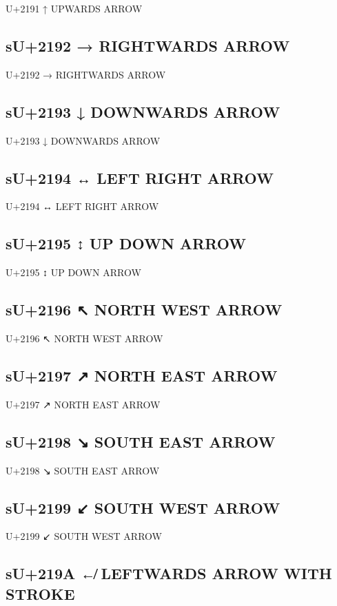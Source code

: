 U+2191 ↑  UPWARDS ARROW

\subsection{sU+2192 →  RIGHTWARDS ARROW}

U+2192 →  RIGHTWARDS ARROW

\subsection{sU+2193 ↓  DOWNWARDS ARROW}

U+2193 ↓  DOWNWARDS ARROW

\subsection{sU+2194 ↔ LEFT RIGHT ARROW}

U+2194 ↔ LEFT RIGHT ARROW

\subsection{sU+2195 ↕ UP DOWN ARROW}

U+2195 ↕ UP DOWN ARROW

\subsection{sU+2196 ↖ NORTH WEST ARROW}

U+2196 ↖ NORTH WEST ARROW

\subsection{sU+2197 ↗ NORTH EAST ARROW}

U+2197 ↗ NORTH EAST ARROW

\subsection{sU+2198 ↘ SOUTH EAST ARROW}

U+2198 ↘ SOUTH EAST ARROW

\subsection{sU+2199 ↙ SOUTH WEST ARROW}

U+2199 ↙ SOUTH WEST ARROW

\subsection{sU+219A ↚ LEFTWARDS ARROW WITH STROKE}

